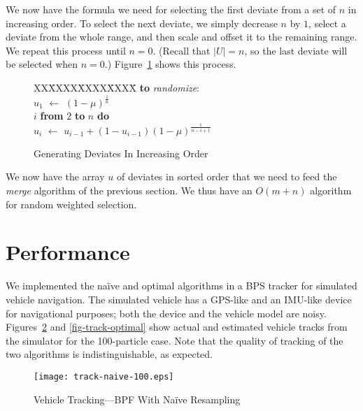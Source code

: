\documentclass[12pt]{article}
\newcommand{\asgn}{\,\,\leftarrow\,\,}
\begin{document}
  We now have the formula we need for selecting the first
  deviate from a set of $n$ in increasing order.  To select
  the next deviate, we simply decrease $n$ by $1$, select a
  deviate from the whole range, and then scale and offset it
  to the remaining range.  We repeat this process until
  $n=0$.  (Recall that $|U|=n$, so the last deviate will be
  selected when $n=0$.)  Figure~\ref{fig-deviate} shows
  this process.
  
  \begin{figure}
    \centering
    \begin{minipage}{0.6\textwidth}
      \begin{tabbing}
      XX\=XXXX\=XXXX\=XXXX\=\kill
      {\bf to} {\it randomize}: \\
      \>$u_1 \asgn (1-\mu)^{\frac{1}{n}}$ \\
       $i$ {\bf from} $2$ {\bf to} $n$ {\bf do} \\
      \>\>$u_i \asgn u_{i-1} + (1-u_{i-1})(1-\mu)^{\frac{1}{n-i+1}}$
    \end{tabbing}
    \end{minipage}
    \caption{Generating Deviates In Increasing Order}\label{fig-deviate}
  \end{figure}

  We now have the array $u$ of deviates in sorted order that
  we need to feed the {\em merge} algorithm of the previous
  section.  We thus have an $O(m + n)$ algorithm for random
  weighted selection.

\section{Performance}

  We implemented the na\"ive and optimal algorithms in a BPS
  tracker for simulated vehicle navigation.  The
  simulated vehicle has a GPS-like and an IMU-like device
  for navigational purposes; both the device and the vehicle
  model are noisy.  Figures~\ref{fig-track-naive} and
  \ref{fig-track-optimal} show actual and estimated vehicle
  tracks from the simulator for the 100-particle case.  Note
  that the quality of tracking of the two algorithms is
  indistinguishable, as expected.

  \begin{figure}
    \centering
    \texttt{[image: track-naive-100.eps]}
    \caption{Vehicle Tracking---BPF With Na\"ive Resampling}\label{fig-track-naive}
  \end{figure}
\end{document}
